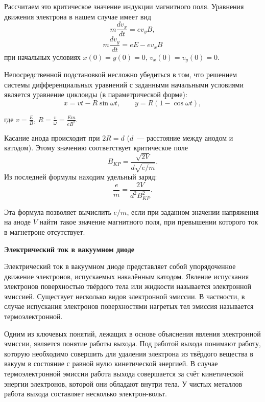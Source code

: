 Рассчитаем это критическое значение индукции магнитного поля. Уравнения движения электрона в нашем случае имеет вид
\begin{equation}
m\frac{dv_x}{dt}=ev_y B,
\end{equation}
\begin{equation}
m\frac{dv_y}{dt}=eE-ev_x B
\end{equation}
при начальных условиях $x(0)=y(0)=0$, $v_x(0)=v_y(0)=0$.

Непосредственной подстановкой несложно убедиться в том, что решением системы дифференциальных уравнений с заданными
начальными условиями является уравнение циклоиды (в параметрической форме):
\begin{equation}
x = vt - R\sin\omega t,\qquad y = R(1-\cos\omega t),
\end{equation}

где $ v=\frac{E}{B}$, $R=\frac{v}{\omega}=\frac{Em}{eB^2}$.

Касание анода происходит при $2R=d$ ($d$~--- расстояние между анодом и катодом). Этому значению соответствует
критическое поле
\begin{equation}
B_{KP}=\frac{\sqrt{2V}}{d\sqrt{e/m}}.
\end{equation}
Из последней формулы находим удельный заряд:
\begin{equation}
\frac{e}{m}=\frac{2V}{d^2B_{KP}^2}.
\end{equation}

Эта формула позволяет вычислить $e/m$, если при заданном значении напряжения на аноде $V$ найти такое значение
магнитного поля, при превышении которого ток в магнетроне отсутствует.

{\bf \Large Электрический ток в вакуумном диоде}

Электрический ток в вакуумном диоде представляет собой упорядоченное движение электронов, испускаемых накалённым
катодом. Явление испускания электронов поверхностью твёрдого тела или жидкости называется {\textsf{электронной эмиссией}}.
Существует несколько видов электронной эмиссии. В частности, в случае испускания электронов поверхностями нагретых тел эмиссия называется {\textsf{термоэлектронной}}.

Одним из ключевых понятий, лежащих в основе объяснения явления электронной эмиссии, является понятие {\textsf{работы выхода}}. Под работой выхода понимают работу, которую необходимо совершить для удаления электрона из твёрдого вещества в вакуум в состояние с равной нулю кинетической энергией. В случае термоэлектронной эмиссии работа выхода совершается за счёт кинетической энергии электронов, которой они обладают внутри тела. У чистых металлов работа выхода составляет несколько электрон-вольт.

